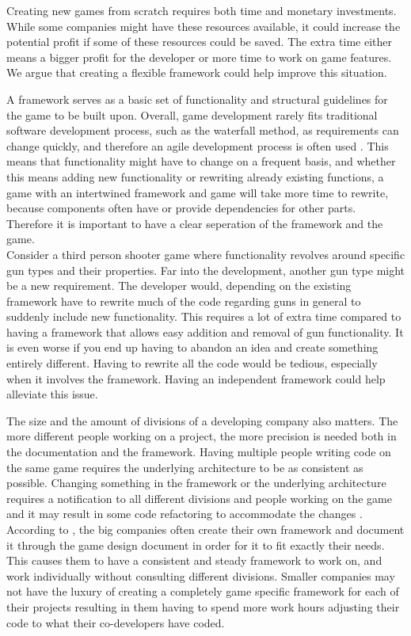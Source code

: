 Creating new games from scratch requires both time and monetary investments. While some companies might have these resources available, it could increase the potential profit if some of these resources could be saved. The extra time either means a bigger profit for the developer or more time to work on game features. We argue that creating a flexible framework could help improve this situation.

A framework serves as a basic set of functionality and structural guidelines for the game to be built upon. Overall, game development rarely fits traditional software development process, such as the waterfall method, as requirements can change quickly, and therefore an agile development process is often used \cite{Gamedevelopment}. This means that functionality might have to change on a frequent basis, and whether this means adding new functionality or rewriting already existing functions, a game with an intertwined framework and game will take more time to rewrite, because components often have or provide dependencies for other parts. Therefore it is important to have a clear seperation of the framework and the game.\\

Consider a third person shooter game where functionality revolves around specific gun types and their properties. Far into the development, another gun type might be a new requirement. The developer would, depending on the existing framework have to rewrite much of the code regarding guns in general to suddenly include new functionality. This requires a lot of extra time compared to having a framework that allows easy addition and removal of gun functionality. It is even worse if you end up having to abandon an idea and create something entirely different. Having to rewrite all the code would be tedious, especially when it involves the framework. Having an independent framework could help alleviate this issue.

The size and the amount of divisions of a developing company also matters. The more different people working on a project, the more precision is needed both in the documentation and the framework. Having multiple people writing code on the same game requires the underlying architecture to be as consistent as possible. Changing something in the framework or the underlying architecture requires a notification to all different divisions and people working on the game and it may result in some code refactoring to accommodate the changes \cite{Gameprod}. According to \citet{Gamedesign}, the big companies often create their own framework and document it through the game design document in order for it to fit exactly their needs. This causes them to have a consistent and steady framework to work on, and work individually without consulting different divisions. Smaller companies may not have the luxury of creating a completely game specific framework for each of their projects resulting in them having to spend more work hours adjusting their code to what their co-developers have coded.

